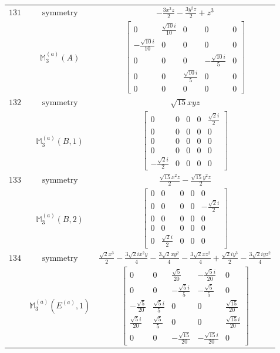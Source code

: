 \documentclass[fleqn,8pt,landscape]{jsarticle}
\begin{document}
\begin{longtable}{ccc}
$ 131 $ & $ \text{symmetry} $ & $ - \frac{3 x^{2} z}{2} - \frac{3 y^{2} z}{2} + z^{3} $ \\
$  $ & $ \mathbb{M}_{3}^{(a)}(A) $ & $ \begin{bmatrix} 0 & \frac{\sqrt{10} i}{10} & 0 & 0 & 0 \\ - \frac{\sqrt{10} i}{10} & 0 & 0 & 0 & 0 \\ 0 & 0 & 0 & - \frac{\sqrt{10} i}{5} & 0 \\ 0 & 0 & \frac{\sqrt{10} i}{5} & 0 & 0 \\ 0 & 0 & 0 & 0 & 0 \end{bmatrix} $ \\ \hline
$ 132 $ & $ \text{symmetry} $ & $ \sqrt{15} x y z $ \\
$  $ & $ \mathbb{M}_{3}^{(a)}(B,1) $ & $ \begin{bmatrix} 0 & 0 & 0 & 0 & \frac{\sqrt{2} i}{2} \\ 0 & 0 & 0 & 0 & 0 \\ 0 & 0 & 0 & 0 & 0 \\ 0 & 0 & 0 & 0 & 0 \\ - \frac{\sqrt{2} i}{2} & 0 & 0 & 0 & 0 \end{bmatrix} $ \\ \hline
$ 133 $ & $ \text{symmetry} $ & $ \frac{\sqrt{15} x^{2} z}{2} - \frac{\sqrt{15} y^{2} z}{2} $ \\
$  $ & $ \mathbb{M}_{3}^{(a)}(B,2) $ & $ \begin{bmatrix} 0 & 0 & 0 & 0 & 0 \\ 0 & 0 & 0 & 0 & - \frac{\sqrt{2} i}{2} \\ 0 & 0 & 0 & 0 & 0 \\ 0 & 0 & 0 & 0 & 0 \\ 0 & \frac{\sqrt{2} i}{2} & 0 & 0 & 0 \end{bmatrix} $ \\ \hline
$ 134 $ & $ \text{symmetry} $ & $ \frac{\sqrt{2} x^{3}}{2} - \frac{3 \sqrt{2} i x^{2} y}{4} - \frac{3 \sqrt{2} x y^{2}}{4} - \frac{3 \sqrt{2} x z^{2}}{4} + \frac{\sqrt{2} i y^{3}}{2} - \frac{3 \sqrt{2} i y z^{2}}{4} $ \\
$  $ & $ \mathbb{M}_{3}^{(a)}(E^{(a)},1) $ & $ \begin{bmatrix} 0 & 0 & \frac{\sqrt{5}}{20} & - \frac{\sqrt{5} i}{20} & 0 \\ 0 & 0 & - \frac{\sqrt{5} i}{5} & - \frac{\sqrt{5}}{5} & 0 \\ - \frac{\sqrt{5}}{20} & \frac{\sqrt{5} i}{5} & 0 & 0 & \frac{\sqrt{15}}{20} \\ \frac{\sqrt{5} i}{20} & \frac{\sqrt{5}}{5} & 0 & 0 & \frac{\sqrt{15} i}{20} \\ 0 & 0 & - \frac{\sqrt{15}}{20} & - \frac{\sqrt{15} i}{20} & 0 \end{bmatrix} $ \\ \hline

\end{longtable}
\end{document}
